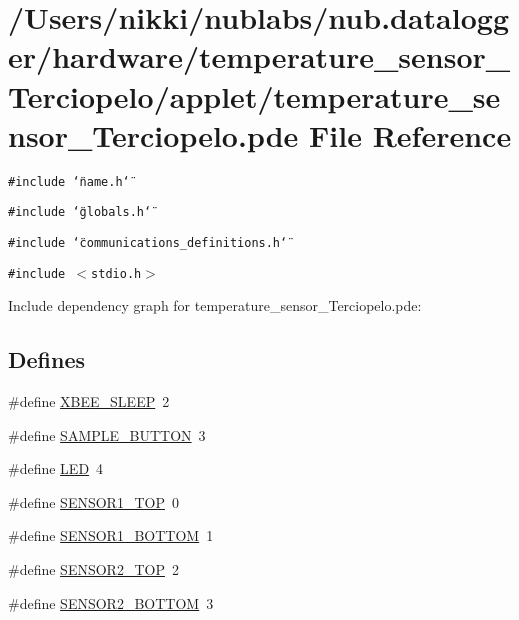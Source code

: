 \hypertarget{applet_2temperature__sensor___terciopelo_8pde}{
\section{/Users/nikki/nublabs/nub.datalogger/hardware/temperature\_\-sensor\_\-Terciopelo/applet/temperature\_\-sensor\_\-Terciopelo.pde File Reference}
\label{applet_2temperature__sensor___terciopelo_8pde}
}
{\tt \#include \char`\"{}name.h\char`\"{}}\par
{\tt \#include \char`\"{}globals.h\char`\"{}}\par
{\tt \#include \char`\"{}communications\_\-definitions.h\char`\"{}}\par
{\tt \#include $<$stdio.h$>$}\par


Include dependency graph for temperature\_\-sensor\_\-Terciopelo.pde:\subsection*{Defines}
\begin{CompactItemize}
\item 
\#define \hyperlink{applet_2temperature__sensor___terciopelo_8pde_658c2878485cfe5cc625d283a6d34bc1}{XBEE\_\-SLEEP}~2
\item 
\#define \hyperlink{applet_2temperature__sensor___terciopelo_8pde_b2de299215608c2a35f0feb86adc2f6f}{SAMPLE\_\-BUTTON}~3
\item 
\#define \hyperlink{applet_2temperature__sensor___terciopelo_8pde_eb7a7ba1ab7e0406f1b5ab36d579f585}{LED}~4
\item 
\#define \hyperlink{applet_2temperature__sensor___terciopelo_8pde_2a2946288d28852ba343b09fd4f17d7a}{SENSOR1\_\-TOP}~0
\item 
\#define \hyperlink{applet_2temperature__sensor___terciopelo_8pde_0da2a51dcb3e00b10aedd07d75f22382}{SENSOR1\_\-BOTTOM}~1
\item 
\#define \hyperlink{applet_2temperature__sensor___terciopelo_8pde_645141ae2ab7fa7ac3f690c4959b6baf}{SENSOR2\_\-TOP}~2
\item 
\#define \hyperlink{applet_2temperature__sensor___terciopelo_8pde_df66e6da6cf8c78004dc0a75fd14d3b1}{SENSOR2\_\-BOTTOM}~3
\end{CompactItemize}
